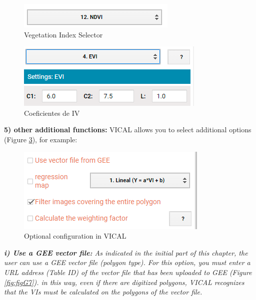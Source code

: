 \documentclass[
]{book}
\begin{document}
\begin{figure}

{\centering \includegraphics{./images/Figure5} 

}

\caption{Vegetation Index Selector}\label{fig:figG4}
\end{figure}

\begin{figure}

{\centering \includegraphics{./images/Figure5.1} 

}

\caption{Coeficientes de IV}\label{fig:figG5}
\end{figure}

\textbf{5) other additional functions: } VICAL allows you to select additional options (Figure \ref{fig:figG6}), for example:

\begin{figure}

{\centering \includegraphics{./images/Figure9} 

}

\caption{Optional configuration in VICAL}\label{fig:figG6}
\end{figure}

\emph{\textbf{i) Use a GEE vector file:} As indicated in the initial part of this chapter, the user can use a GEE vector file (polygon type). For this option, you must enter a URL address (Table ID) of the vector file that has been uploaded to GEE (Figure \ref{fig:figG7}). in this way, even if there are digitized polygons, VICAL recognizes that the VIs must be calculated on the polygons of the vector file. }
\end{document}
